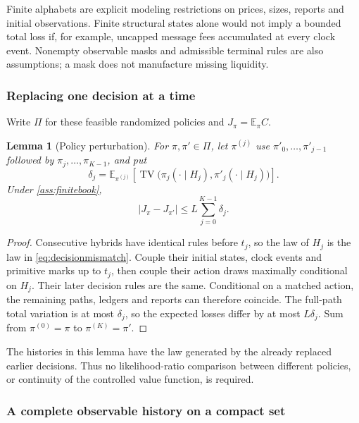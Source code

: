 \documentclass[11pt]{article}
\numberwithin{equation}{section}
\newtheorem{lemma}[theorem]{Lemma}
\theoremstyle{definition}
\theoremstyle{remark}
\newcommand{\E}{\mathbb{E}}
\theoremstyle{definition}
\newcommand{\TV}{\operatorname{TV}}
\begin{document}
Finite alphabets are explicit modeling restrictions on prices, sizes,
reports and initial observations. Finite structural states alone would not
imply a bounded total loss if, for example, uncapped message fees accumulated
at every clock event. Nonempty observable masks and admissible terminal
rules are also assumptions; a mask does not manufacture missing liquidity.

\subsubsection*{Replacing one decision at a time}

Write $\Pi$ for these feasible randomized policies and $J_\pi=\E_\pi C$.

\begin{lemma}[Policy perturbation]\label{lem:policyperturb}
For $\pi,\pi'\in\Pi$, let $\pi^{(j)}$ use
$\pi'_0,\ldots,\pi'_{j-1}$ followed by
$\pi_j,\ldots,\pi_{K-1}$, and put
\begin{equation}\label{eq:decisionmismatch}
 \delta_j=\E_{\pi^{(j)}}\left[
 \TV\bigl(\pi_j(\cdot\mid H_j),\pi'_j(\cdot\mid H_j)\bigr)\right].
\end{equation}
Under \cref{ass:finitebook},
\begin{equation}\label{eq:policyperturb}
 |J_\pi-J_{\pi'}|\le L\sum_{j=0}^{K-1}\delta_j.
\end{equation}
\end{lemma}
\begin{proof}
Consecutive hybrids have identical rules before $t_j$, so the law of $H_j$
is the law in \eqref{eq:decisionmismatch}. Couple their initial states,
clock events and primitive marks up to $t_j$, then couple their action
draws maximally conditional on $H_j$. Their later decision rules are the
same. Conditional on a matched action, the remaining paths, ledgers and
reports can therefore coincide. The full-path total variation is at most
$\delta_j$, so the expected losses differ by at most $L\delta_j$.
Sum from $\pi^{(0)}=\pi$ to $\pi^{(K)}=\pi'$.
\end{proof}

The histories in this lemma have the law generated by the already replaced
earlier decisions. Thus no likelihood-ratio comparison between different
policies, or continuity of the controlled value function, is required.

\subsubsection*{A complete observable history on a compact set}
\end{document}
